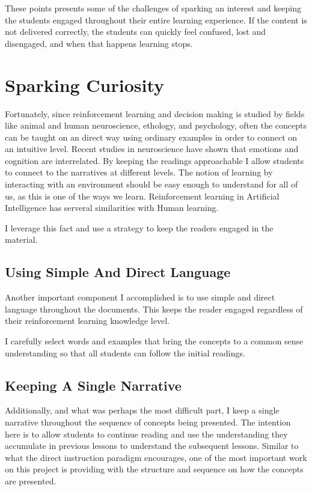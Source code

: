 \documentclass[11pt]{article} %
\begin{document}
These points presents some of the challenges of sparking an interest and keeping the
students engaged throughout their entire learning experience. If the content is not
delivered correctly, the students can quickly feel confused, lost and disengaged, and
when that happens learning stops.

\section{Sparking Curiosity}

Fortunately, since reinforcement learning and decision making is studied
by fields like animal and human neuroscience, ethology, and psychology\cite{suttons98},
often the concepts can be taught on an direct way using ordinary examples
in order to connect on an intuitive level. Recent studies in neuroscience have
shown that emotions and cognition are interrelated\cite{intuition}. By keeping
the readings approachable I allow students to connect to the narratives at different
levels. The notion of learning by interacting with an environment should be easy enough
to understand for all of us, as this is one of the ways we learn. Reinforcement
learning in Artificial Intelligence has serveral similarities with Human learning.

I leverage this fact and use a strategy to keep the readers engaged in the
material.

\subsection{Using Simple And Direct Language}

Another important component I accomplished is to use simple and direct
language throughout the documents. This keeps the reader engaged regardless
of their reinforcement learning knowledge level.

I carefully select words and examples that bring the concepts to a
common sense understanding so that all students can follow the initial
readings.

\subsection{Keeping A Single Narrative}

Additionally, and what was perhaps the most difficult part, I keep a single
narrative throughout the sequence of concepts being presented. The intention
here is to allow students to continue reading and use the understanding they
accumulate in previous lessons to understand the subsequent lessons. Similar to what
the direct instruction paradigm\cite{directinstruction} encourages, one of the
most important work on this project is providing with the structure and sequence
on how the concepts are presented.
\end{document}
